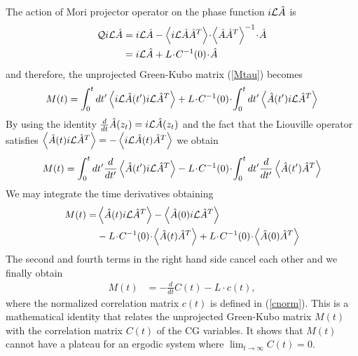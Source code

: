 \documentclass[b5paper,openright,10pt]{book}
\newcommand{\esc}{\!\cdot\!}
\newcommand{\llangle}{\left\langle}
\newcommand{\rrangle}{\right\rangle}
\begin{document}
The action  of Mori projector  operator on the phase  function $i{\cal
  L}\hat{A}$ is
\begin{align}
{\cal Q} i{\cal L}\hat{A} &= i{\cal L}\hat{A}-\llangle i{\cal L}\hat{A} \hat{A}^T\rrangle\esc \llangle\hat{A}\hat{A}^T\rrangle^{-1}\esc \hat{A}
\nonumber\\
&=
i{\cal L}\hat{A}+L\esc C^{-1}(0)\esc \hat{A}  
\label{QiLA}
\end{align}
and therefore, the unprojected Green-Kubo matrix (\ref{Mtau}) becomes
\begin{align}
M(t)=
  \int_0^{t} dt' \llangle i{\cal L}\hat{A}(t') i{\cal L}\hat{A}^T\rrangle
+
L\esc C^{-1}(0)\esc   \int_0^{t} dt' \llangle \hat{A}(t') i{\cal L}\hat{A}^T\rrangle
\end{align}
By using the identity $\frac{d}{dt}\hat{A}(z_t)=i{\cal L}\hat{A}(z_t)$
and the  fact that  the Liouville  operator satisfies  $
\llangle   \hat{A}(t)   i{\cal  L}\hat{A}^T\rrangle=-\llangle   i{\cal
  L}\hat{A}(t) \hat{A}^T\rrangle$ we obtain
\begin{align}
M(t)=
  \int_0^{t} dt' \frac{d}{dt'}\llangle \hat{A}(t') i{\cal L}\hat{A}^T\rrangle
-
L\esc C^{-1}(0)\esc   \int_0^{t} dt' \frac{d}{dt'}\llangle \hat{A}(t') \hat{A}^T\rrangle
\end{align}
We may integrate the time derivatives obtaining
  \begin{align}
    M(t)=&\llangle \hat{A}(t) i{\cal L}\hat{A}^T\rrangle-\llangle \hat{A}(0) i{\cal L}\hat{A}^T\rrangle
    \nonumber \\
    &-L\esc C^{-1}(0)\esc   \llangle \hat{A}(t) \hat{A}^T\rrangle
+L\esc C^{-1}(0)\esc   \llangle \hat{A}(0) \hat{A}^T\rrangle
\end{align}
The second and  fourth terms in the right hand  side cancel each other
and we finally obtain
\begin{align}
M(t)&=-\frac{d}{dt}C(t)-L\esc c(t),
\label{Math1}
\end{align}
where the normalized correlation matrix $c(t)$ is defined in (\ref{cnorm}).
This is a mathematical identity that  relates 
  the unprojected Green-Kubo matrix $M(t)$ with the correlation matrix $C(t)$ of the CG variables. It shows
that $M(t)$ cannot have a plateau for an ergodic system where $\lim_{t\to\infty}C(t)= 0$. 
\end{document}
